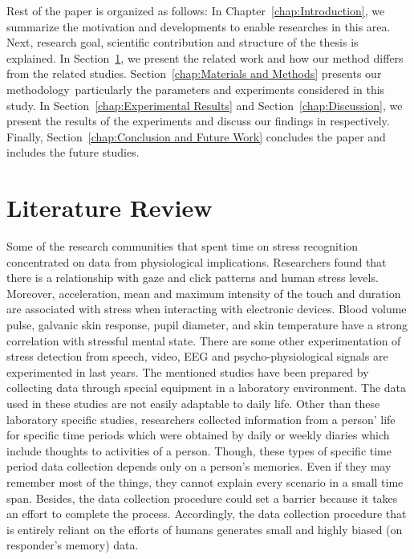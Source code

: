 \documentclass[12pt,oneandhalf,chaparabic,lfm,phd,eng,oneside,pntc]{gsufbe}
\begin{document}
Rest of the paper is organized as follows: 
In Chapter~\ref{chap:Introduction}, we summarize the motivation and developments to enable researches in this area. Next, research goal, scientific contribution and structure of the thesis is explained.
In Section~\ref{chap:Literature Review}, we present the related work and how our method differs from the related studies. Section~\ref{chap:Materials and Methods} presents our methodology\ particularly the parameters and experiments considered in this study. In Section~\ref{chap:Experimental Results} and Section~\ref{chap:Discussion}, we present the results of the experiments and discuss our findings in respectively. Finally, Section~\ref{chap:Conclusion and Future Work} concludes the paper and includes the future studies.


\chapter{Literature Review}
\label{chap:Literature Review}
Some of the research communities that spent time on stress recognition concentrated on data from physiological implications. Researchers found that there is a relationship with gaze and click patterns and human stress levels. Moreover, acceleration, mean and maximum intensity of the touch and duration are associated with stress when interacting with electronic devices. Blood volume pulse, galvanic skin response, pupil diameter, and skin temperature have a strong correlation with stressful mental state. There are some other experimentation of stress detection from speech, video, EEG and psycho-physiological signals are experimented in last years. 
The mentioned studies have been prepared by collecting data through special equipment in a laboratory environment. The data used in these studies are not easily adaptable to daily life. Other than these laboratory specific studies, researchers collected information from a person’ life for specific time periods which were obtained by daily or weekly diaries which include thoughts to activities of a person. Though, these types of specific time period data collection depends only on a person’s memories. Even if they may remember most of the things, they cannot explain every scenario in a small time span. Besides, the data collection procedure could set a barrier because it takes an effort to complete the process. Accordingly, the data collection procedure that is entirely reliant on the efforts of humans generates small and highly biased (on responder’s memory) data. 
\end{document}
